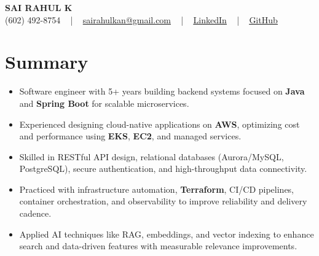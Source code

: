 \documentclass[letterpaper,11pt]{article}
\newcommand{\resumeItem}[1]{
  \item\footnotesize{
    {#1 \vspace{-2pt}}
  }
}
\newcommand{\resumeItemListStart}{\begin{itemize}[leftmargin=*]}
\newcommand{\resumeItemListEnd}{\end{itemize}\vspace{-5pt}}
\begin{document}
\begin{center}
    {\fontsize{14pt}{12pt}\selectfont \textbf{\MakeUppercase{Sai Rahul K}}}\\ \vspace{2pt}
    \fontsize{10pt}{12pt}\selectfont (602) 492-8754 ~ | ~ \href{mailto:sairahulkan@gmail.com}{sairahulkan@gmail.com} ~ | ~
    \href{https://www.linkedin.com/in/rq123/}{\color{blue}\underline{LinkedIn}} ~ | ~
    \href{https://github.com/kanrahuldo}{\color{blue}\underline{GitHub}}~
    \vspace{-8pt}
\end{center}

\section{Summary}
\fontsize{9pt}{10pt}\selectfont
\resumeItemListStart
    \resumeItem{Software engineer with 5+ years building backend systems focused on \textbf{Java} and \textbf{Spring Boot} for scalable microservices.}
    \resumeItem{Experienced designing cloud-native applications on \textbf{AWS}, optimizing cost and performance using \textbf{EKS}, \textbf{EC2}, and managed services.}
    \resumeItem{Skilled in RESTful API design, relational databases (Aurora/MySQL, PostgreSQL), secure authentication, and high-throughput data connectivity.}
    \resumeItem{Practiced with infrastructure automation, \textbf{Terraform}, CI/CD pipelines, container orchestration, and observability to improve reliability and delivery cadence.}
    \resumeItem{Applied AI techniques like RAG, embeddings, and vector indexing to enhance search and data-driven features with measurable relevance improvements.}
\resumeItemListEnd
\vspace{-6pt}
\end{document}
